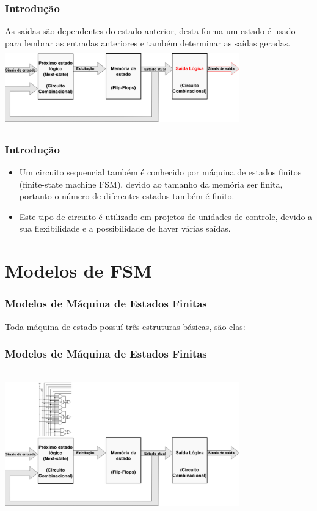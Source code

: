 \documentclass{beamer}
\begin{document}
  \begin{frame}
    \frametitle{Introdução}
    As saídas são dependentes do estado anterior, desta forma um estado é usado para lembrar as entradas anteriores e também determinar as saídas geradas. 
    \includegraphics[height = 1.3in, width = 4in]{modelo_3.png}
  \end{frame}

  \begin{frame}
    \frametitle{Introdução}
    \begin{itemize}
      \item Um circuito sequencial também é conhecido por máquina de estados finitos (finite-state machine FSM), devido ao tamanho da memória ser finita, 
	    portanto o número de diferentes estados também é finito.\pause
      \item Este tipo de circuito é utilizado em projetos de unidades de controle, devido a sua flexibilidade e a possibilidade de haver várias saídas.
    \end{itemize}
  \end{frame}

\section{Modelos de FSM}
\begin{frame}
  \frametitle{Modelos de Máquina de Estados Finitas}
   Toda máquina de estado possuí três estruturas básicas, são elas:
\end{frame}

\begin{frame}
  \frametitle{Modelos de Máquina de Estados Finitas}
    \includegraphics[height = 2.5in, width = 4in]{modelo_4.png}
\end{frame}
\end{document}
